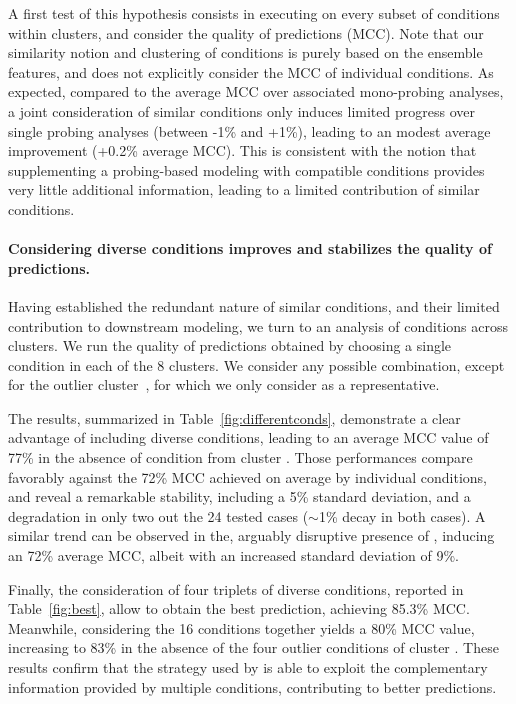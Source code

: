 \documentclass[a4,center,fleqn]{NAR}
\begin{document}
A first test of this hypothesis consists in executing \OurTool{} on every subset of conditions within clusters, and consider the quality of predictions (MCC). 
Note that our similarity notion and clustering of conditions is purely based on the ensemble features, and does not explicitly consider the MCC of individual conditions. 
As expected, compared to the average MCC over associated mono-probing analyses, a joint consideration of similar conditions only induces limited progress over single probing analyses (between -1\% and +1\%), leading to an modest average improvement (+0.2\% average MCC). This is consistent with the notion that supplementing a probing-based modeling with compatible conditions provides very little additional information, leading to a limited contribution of similar conditions. 



\paragraph{Considering diverse conditions improves and stabilizes the quality of predictions.} 
Having established the redundant nature of similar conditions, and their limited contribution to downstream modeling, we turn to an analysis of conditions across clusters.  We run \OurTool{} the quality of predictions obtained by choosing a single condition in each of the 8 clusters. We consider any possible combination, except for the outlier cluster~, for which we only consider \NAICE as a representative.

The results, summarized in Table~\ref{fig:differentconds}, demonstrate a clear advantage of including diverse conditions, leading to an average MCC value of 77\% in the absence of condition from cluster . Those performances compare favorably against the 72\% MCC achieved on average by individual conditions, and reveal a remarkable stability, including a 5\% standard deviation, and a degradation in only two out the 24 tested cases ($\sim$1\% decay in both cases).  A similar trend can be observed in the, arguably disruptive presence of \NAICE, inducing an 72\% average MCC, albeit with an increased standard deviation of 9\%.

Finally, the consideration of four triplets of diverse conditions, reported in Table~\ref{fig:best}, allow to obtain the best prediction, achieving 85.3\% MCC. Meanwhile, considering the 16 conditions together yields a 80\% MCC value, increasing to 83\% in the absence of the four outlier conditions of cluster . These results confirm that the strategy used by \OurTool{} is able to exploit the complementary information provided by multiple conditions, contributing to better predictions.
\end{document}
